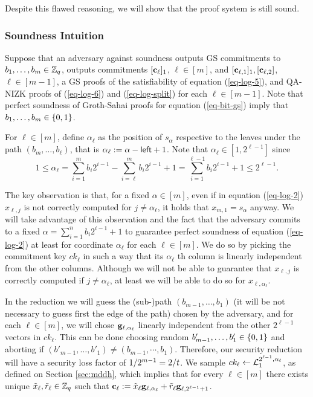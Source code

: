 Despite this flawed reasoning, we will show that the proof system is still sound.

\subsubsection{Soundness Intuition}
Suppose that an adversary against soundness outputs GS commitments to \(b_1,\ldots,b_{m}\in\mathbb{Z}_q\), outputs commitments \([\mathbf{c}_\ell]_1\), $\ell\in[m]$, and \([\mathbf{c}_{\ell,1}]_1,[\mathbf{c}_{\ell,2}]\), $\ell\in[m-1]$, a GS proofs of the satisfiability of equation (\ref{eq-log-5}), and QA-NIZK proofs of (\ref{eq-log-6}) and (\ref{eq-log-split}) for each \(\ell\in[m-1]\).
Note that perfect soundness of Groth-Sahai proofs for equation (\ref{eq-bit-gs}) imply that \(b_1,\ldots,b_m\in\{0,1\}\).

For $\ell\in[m]$, define $\alpha_\ell$ as the position of $s_\alpha$ respective to the leaves under the path $(b_m,\ldots, b_\ell)$, that is $\alpha_\ell:=\alpha-{\mathsf{left}}+1$. Note that $\alpha_\ell \in[1,2^{\ell-1}]$ since
$$
1\leq\alpha_\ell = \sum_{i=1}^m b_i2^{i-1}-\sum_{i=\ell}^mb_i2^{i-1}+1 = \sum_{i=1}^{\ell-1}b_i2^{i-1}+1\leq 2^{\ell-1}.
$$

The key observation is that, for a fixed $\alpha\in[m]$, even if in equation (\ref{eq-log-2}) $x_{\ell,j}$ is not correctly computed for $j\neq\alpha_\ell$, it holds that $x_{m,1}=s_\alpha$ anyway. We will take advantage of this observation and the fact that the adversary commits to a fixed $\alpha=\sum_{i=1}^n b_i2^{i-1}+1$ to guarantee perfect soundness of equation (\ref{eq-log-2}) at least for coordinate $\alpha_\ell$ for each $\ell\in[m]$. We do so by picking the commitment key $ck_\ell$ in such a way that its $\alpha_\ell$ th column is linearly independent from the other columns. Although we will not be able to guarantee that $x_{\ell,j}$ is correctly computed if $j\neq\alpha_\ell$, at least we will be able to do so for $x_{\ell,\alpha_\ell}$.

In the reduction we will guess the (sub-)path $(b_{m-1},\ldots, b_1)$ (it will be not necessary to guess first the edge of the path) chosen by the adversary, and for each $\ell\in[m]$, we will chose $\mathbf{g}_{\ell,\alpha_\ell}$ linearly independent from the other $2^{\ell-1}$ vectors in $ck_\ell$. This can be done choosing  random $b'_{m-1},\ldots, b'_1\in\{0,1\}$ and aborting if $(b'_{m-1},\ldots, b'_{1})\neq(b_{m-1},\cdots, b_1)$. Therefore, our security reduction will have a security loss factor of $1/2^{m-1}=2/t$. We sample $ck_\ell\gets\mathcal{L}_1^{2^{\ell-1},\alpha_\ell}$, as defined on Section \ref{sec:mddh}, which implies that for every $\ell\in[m]$ there exists unique $\tilde{x}_{\ell},\tilde{r}_\ell\in\mathbb{Z}_q$ such that $\mathbf{c}_\ell:=\tilde{x}_\ell\mathbf{g}_{\ell,\alpha_\ell}+\tilde{r}_\ell\mathbf{g}_{\ell,2^{\ell-1}+1}$.


